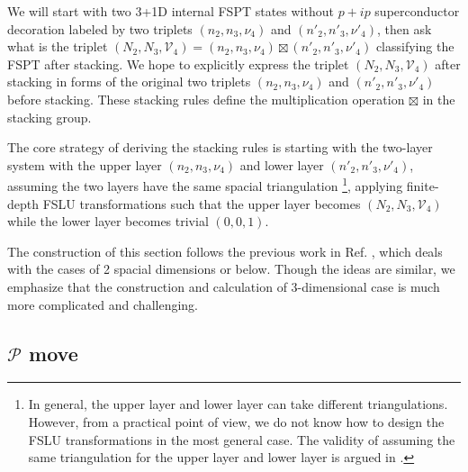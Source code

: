 \documentclass[%
 reprint,
 amsmath,amssymb,
 aps,
prb,
]{revtex4-2}
\begin{document}
We will start with two 3+1D internal FSPT states without $p+ip$ superconductor decoration labeled by two triplets $(n_2, n_3, \nu_4)$ and $(n'_2, n'_3, \nu'_4)$, then ask what is the triplet $(N_2, N_3, \mathcal{V}_4) = (n_2, n_3, \nu_4) \boxtimes (n'_2, n'_3, \nu'_4)$ classifying the FSPT after stacking.
We hope to explicitly express the triplet $(N_2, N_3, \mathcal{V}_4)$ after stacking in forms of the original two triplets $(n_2, n_3, \nu_4)$ and $(n'_2, n'_3, \nu'_4)$ before stacking.
These stacking rules define the multiplication operation $\boxtimes$ in the stacking group.

The core strategy of deriving the stacking rules is starting with the two-layer system with the upper layer $(n_2, n_3, \nu_4)$ and lower layer $(n'_2, n'_3, \nu'_4)$, assuming the two layers have the same spacial triangulation  
\footnote{In general, the upper layer and lower layer can take different triangulations. However, from a practical point of view, we do not know how to design the FSLU transformations in the most general case. The validity of assuming the same triangulation for the upper layer and lower layer is argued in \cite{ren2023stacking}.}, 
applying finite-depth FSLU transformations such that the upper layer becomes $(N_2, N_3, \mathcal{V}_4)$ while the lower layer becomes trivial $(0, 0, 1)$.

The construction of this section follows the previous work in Ref. \cite{ren2023stacking}, which deals with the cases of 2 spacial dimensions or below. Though the ideas are similar, we emphasize that the construction and calculation of 3-dimensional case is much more complicated and challenging.


\subsection{$\mathcal P$ move}
\end{document}
